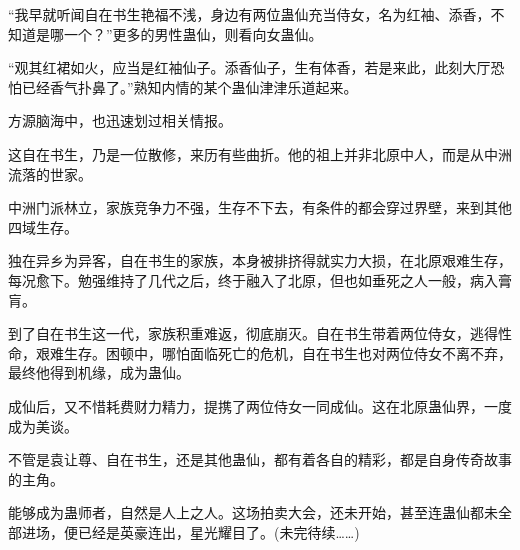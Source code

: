 \begin{this_body}
“我早就听闻自在书生艳福不浅，身边有两位蛊仙充当侍女，名为红袖、添香，不知道是哪一个？”更多的男性蛊仙，则看向女蛊仙。

“观其红裙如火，应当是红袖仙子。添香仙子，生有体香，若是来此，此刻大厅恐怕已经香气扑鼻了。”熟知内情的某个蛊仙津津乐道起来。

方源脑海中，也迅速划过相关情报。

这自在书生，乃是一位散修，来历有些曲折。他的祖上并非北原中人，而是从中洲流落的世家。

中洲门派林立，家族竞争力不强，生存不下去，有条件的都会穿过界壁，来到其他四域生存。

独在异乡为异客，自在书生的家族，本身被排挤得就实力大损，在北原艰难生存，每况愈下。勉强维持了几代之后，终于融入了北原，但也如垂死之人一般，病入膏肓。

到了自在书生这一代，家族积重难返，彻底崩灭。自在书生带着两位侍女，逃得性命，艰难生存。困顿中，哪怕面临死亡的危机，自在书生也对两位侍女不离不弃，最终他得到机缘，成为蛊仙。

成仙后，又不惜耗费财力精力，提携了两位侍女一同成仙。这在北原蛊仙界，一度成为美谈。

不管是袁让尊、自在书生，还是其他蛊仙，都有着各自的精彩，都是自身传奇故事的主角。

能够成为蛊师者，自然是人上之人。这场拍卖大会，还未开始，甚至连蛊仙都未全部进场，便已经是英豪连出，星光耀目了。(未完待续……)

\end{this_body}

